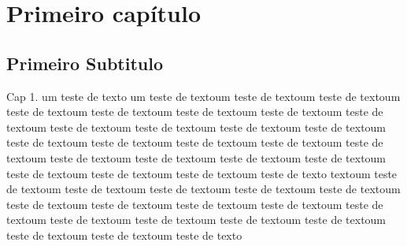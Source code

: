 \section{Primeiro capítulo}

\subsection{Primeiro Subtitulo}

Cap 1. um teste de texto um teste de textoum teste de textoum teste de textoum teste de textoum teste de textoum teste de textoum teste de textoum teste de textoum teste de textoum teste de textoum teste de textoum teste de textoum teste de textoum teste de textoum teste de textoum teste de textoum teste de textoum teste de textoum teste de textoum teste de textoum teste de textoum teste de textoum teste de textoum teste de textoum teste de texto textoum teste de textoum teste de textoum teste de textoum teste de textoum teste de textoum teste de textoum teste de textoum teste de textoum teste de textoum teste de textoum teste de textoum teste de textoum teste de textoum teste de textoum teste de textoum teste de textoum teste de texto